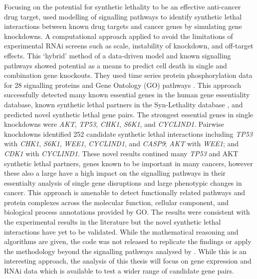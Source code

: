 Focusing on the potential for synthetic lethality to be an effective anti-cancer drug target, \citet{Zhang2015} used modelling of signalling pathways to identify synthetic lethal interactions between known drug targets and cancer genes by simulating gene knockdowns. A computational approach applied to avoid the limitations of experimental RNAi screens such as scale, instability of knockdown, and off-target effects. This `hybrid' method of a data-driven model and known signalling pathways showed potential as a means to predict cell death in single and combination gene knockouts. They used time series protein phosphorylation data \citep{Lee2012} for 28 signalling proteins and Gene Ontology (GO) pathways \citet{Ashburner2000, Blake2015}. This approach successfully detected many known essential genes in the human gene essentiality database, known synthetic lethal partners in the Syn-Lethality database \citep{Li2014}, and predicted novel synthetic lethal gene pairs. The strongest essential genes in single knockdowns were \textit{AKT}, \textit{TP53}, \textit{CHK1}, \textit{S6K1}, and \textit{CYCLIND1}. Pairwise knockdowns identified 252 candidate synthetic lethal interactions including \textit{TP53} with \textit{CHK1}, \textit{S6K1}, \textit{WEE1}, \textit{CYCLIND1}, and \textit{CASP9}; \textit{AKT} with \textit{WEE1}; and \textit{CDK1} with \textit{CYCLIND1}. These novel results contined many \textit{TP53} and AKT synthetic lethal partners, genes known to be important in many cancers, however these also a large have a high impact on the signalling pathways in their essentialty analysis of single gene disruptions and large phenotypic changes in cancer. This approach is amenable to detect functionally related pathways and protein complexes across the molecular function, cellular component, and biological process annotations provided by GO. The results were consistent with the experimental results in the literature but the novel synthetic lethal interactions have yet to be validated. While the mathematical reasoning and algorithms are given, the code was not released to replicate the findings or apply the methodology beyond the signalling pathways analysed by \citet{Zhang2015}. While this is an interesting approach, the analysis of this thesis will focus on gene expression and RNAi data which is available to test a wider range of candidate gene pairs.


